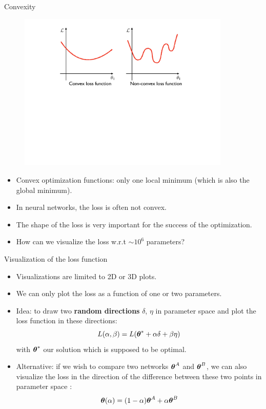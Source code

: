 \documentclass[xcolor=pdftex,dvipsnames,table]{beamer}
\begin{document}
\begin{frame}{Convexity}
\begin{figure}[htb]
\includegraphics[width=0.9\textwidth]{../graphics/Vis_convexity.pdf}
\end{figure}
\begin{itemize}
	\item Convex optimization functions: only one local minimum (which is also the global minimum). 
	\item In neural networks, the loss is often not convex. 
	\item The shape of the loss is very important for the success of the optimization. 
	\item How can we visualize the loss w.r.t $\sim10^6$ parameters? 
\end{itemize}
\end{frame}

\begin{frame}{Visualization of the loss function}
\begin{itemize}
	\item Visualizations are limited to 2D or 3D plots.
	\item We can only plot the loss as a function of one or two parameters. 
	\item Idea: to draw two {\bf random directions} $\delta$, $\eta$ in parameter space and plot the loss function in these directions:
	\begin{equation}
	L (\alpha, \beta) = L(\boldsymbol{\theta}^{\ast} + \alpha \delta + \beta \eta) 
	\end{equation}
	with $\boldsymbol{\theta}^{\ast}$ our solution which is supposed to be optimal. 
	\item Alternative: if we wish to compare two networks $\boldsymbol{\theta}^A$ and $\boldsymbol{\theta}^B$, we can also visualize the loss in the direction of the difference between these two points in parameter space \cite{Goodfellow:2015}:
	\begin{equation}
		\boldsymbol{\theta}(\alpha) = (1 - \alpha)\boldsymbol{\theta}^A + \alpha \boldsymbol{\theta}^B
	\end{equation}
\end{itemize}
\end{frame}
\end{document}
